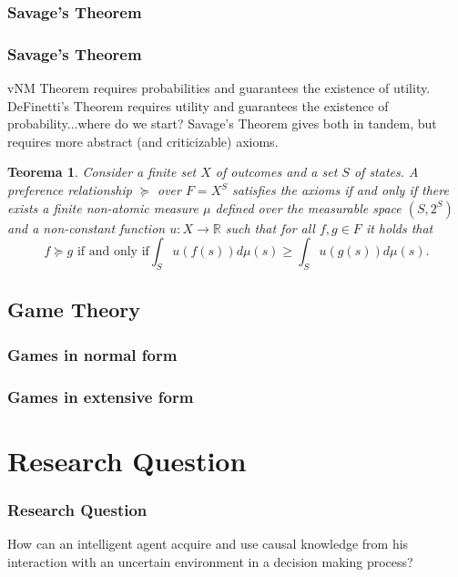\documentclass{beamer}
\theoremstyle{plain}
\newtheorem{teo}{Teorema}
\begin{document}
		\subsubsection{Savage's Theorem}
		\begin{frame}
		\frametitle{Savage's Theorem}
		vNM Theorem requires probabilities and guarantees the existence of utility. DeFinetti's Theorem requires utility and guarantees the existence of probability...where do we start? Savage's Theorem gives both in tandem, but requires more abstract (and criticizable) axioms.
		\begin{teo}
		Consider a finite set $X$ of outcomes and a set $S$ of states.  A preference relationship $\succeq$ over $F=X^S$ satisfies the axioms if and only if there exists a finite non-atomic measure $\mu$ defined over the measurable space $(S, 2^S)$ and a non-constant function $u :X \to \mathbb{R}$ such that for all $f,g \in F$ it holds that
		\[ f \succeq g \textrm{ if and only if} \int_S u(f(s)) d \mu(s) \geq \int_S u(g(s)) d \mu(s). \]
		\end{teo}
		\end{frame}
		
	\subsection{Game Theory}
		\subsubsection{Games in normal form}
		\subsubsection{Games in extensive form}
\section{Research Question}
\begin{frame}
\frametitle{Research Question}
How can an intelligent agent acquire and use causal knowledge from his interaction with an uncertain environment in a decision making process?
\end{frame}
\end{document}
